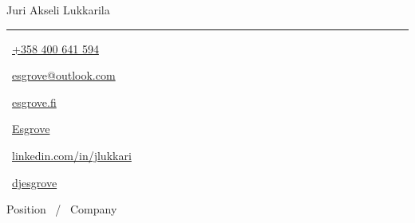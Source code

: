 \documentclass[11pt,a4paper,oneside]{article}
\newcommand*{\logopic}[1]{
        \raisebox{-0.34\baselineskip}{ %
                \texttt{[image: \#1]}}
}
\begin{document}
\begin{minipage}{\textwidth}
        \raggedright
        \centering
        {\Huge \namefont \color{headcolor}{Cover} \color{textcolor}{Letter}} \hfill 
        {\huge \namefont Juri Akseli Lukkarila}
        \vspace{0.6mm}
        \rule[0.6mm]{\textwidth}{2pt}
        \fontsize{9pt}{9pt}\selectfont
        \hspace*{1mm}
        \logopic{call.pdf} \ \href{tel:+358400641594}{+358 400 641 594} \hfill
        \logopic{mail.pdf} \ \href{mailto:esgrove@outlook.com}{esgrove@outlook.com} \hfill
        \logopic{web.pdf}  \ \href{www.esgrove.fi}{esgrove.fi} \hfill
        \logopic{github.pdf} \ \href{https://github.com/Esgrove}{Esgrove} \hfill
        \logopic{In-2C-128px-R.png} \ \href{https://www.linkedin.com/in/jlukkari/}{linkedin.com/in/jlukkari} \hfill
        \logopic{twitter.pdf} \ \href{https://twitter.com/djesgrove}{djesgrove}
        \hspace*{1mm}
\end{minipage}

\vspace{0.7cm}

\begin{center}
{\titledatefont \LARGE Position \ / \  Company} \\
\end{center}

\Blindtext
\end{document}
